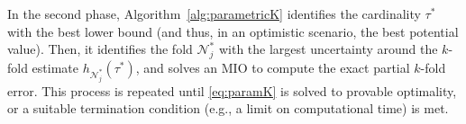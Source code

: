 \documentclass[mnsc,nonblindrev]{informs3} %
\begin{document}
{In the second phase, Algorithm~\ref{alg:parametricK} identifies the cardinality $\tau^*$ with the best lower bound (and thus, in an optimistic scenario, the best potential value). Then, it identifies the fold $\mathcal{N}_j^*$ with the largest uncertainty around the $k$-fold estimate $h_{\mathcal{N}_j^*}(\tau^*)$, and solves an MIO to compute the exact partial $k$-fold error. %
This process is repeated until \eqref{eq:paramK} is solved to provable optimality, or a suitable termination condition (e.g., a limit on computational time) %
is met. %
}


\normalem
\end{document}
